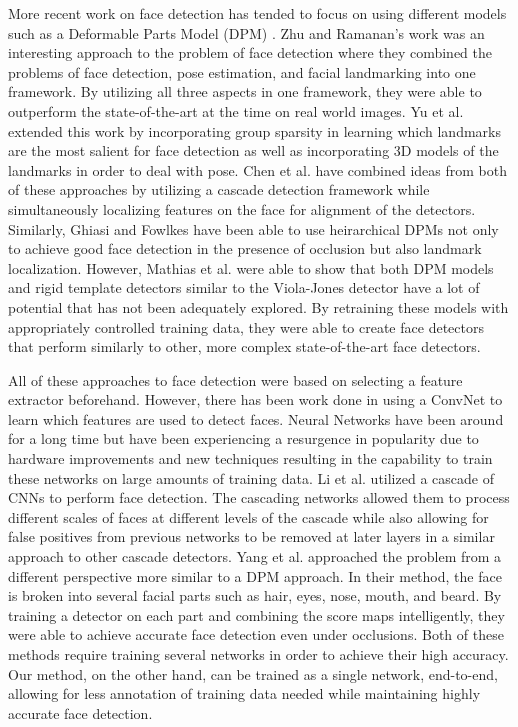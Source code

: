 \documentclass[10pt,journal,cspaper,compsoc]{IEEEtran}
\begin{document}
More recent work on face detection has tended to focus on using different models such as a Deformable Parts Model (DPM) \cite{zhu2012face, Felzenszwalb}. Zhu and Ramanan's work was an interesting approach to the problem of face detection where they combined the problems of face detection, pose estimation, and facial landmarking into one framework. By utilizing all three aspects in one framework, they were able to outperform the state-of-the-art at the time on real world images. Yu et al. \cite{yu2013pose} extended this work by incorporating group sparsity in learning which landmarks are the most salient for face detection as well as incorporating 3D models of the landmarks in order to deal with pose. Chen et al. \cite{chen2014jointcascade} have combined ideas from both of these approaches by utilizing a cascade detection framework while simultaneously localizing features on the face for alignment of the detectors. Similarly, Ghiasi and Fowlkes \cite{ghiasi2015multireshpm} have been able to use heirarchical DPMs not only to achieve good face detection in the presence of occlusion but also landmark localization. However, Mathias et al. \cite{mathias2014face} were able to show that both DPM models and rigid template detectors similar to the Viola-Jones detector have a lot of potential that has not been adequately explored. By retraining these models with appropriately controlled training data, they were able to create face detectors that perform similarly to other, more complex state-of-the-art face detectors.

All of these approaches to face detection were based on selecting a feature extractor beforehand. However, there has been work done in using a ConvNet to learn which features are used to detect faces. Neural Networks have been around for a long time but have been experiencing a resurgence in popularity due to hardware improvements and new techniques resulting in the capability to train these networks on large amounts of training data. Li et al. \cite{li2015cascadecnn} utilized a cascade of CNNs to perform face detection. The cascading networks allowed them to process different scales of faces at different levels of the cascade while also allowing for false positives from previous networks to be removed at later layers in a similar approach to other cascade detectors. Yang et al. \cite{yang2015faceness} approached the problem from a different perspective more similar to a DPM approach. In their method, the face is broken into several facial parts such as hair, eyes, nose, mouth, and beard. By training a detector on each part and combining the score maps intelligently, they were able to achieve accurate face detection even under occlusions. Both of these methods require training several networks in order to achieve their high accuracy. Our method, on the other hand, can be trained as a single network, end-to-end, allowing for less annotation of training data needed while maintaining highly accurate face detection.
\end{document}
